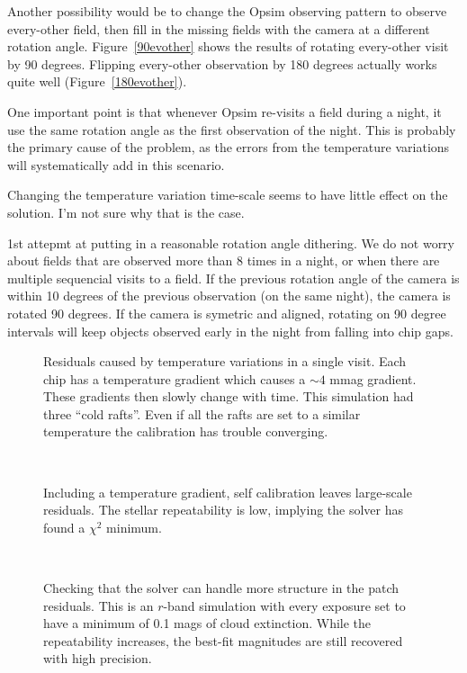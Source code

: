 Another possibility would be to change the Opsim observing pattern to observe every-other field, then fill in the missing fields with the camera at a different rotation angle.  Figure~\ref{90evother} shows the results of rotating every-other visit by 90 degrees.  Flipping every-other observation by 180 degrees actually works quite well (Figure~\ref{180evother}).

One important point is that whenever Opsim re-visits a field during a night, it use the same rotation angle as the first observation of the night.  This is probably the primary cause of the problem, as the errors from the temperature variations will systematically add in this scenario.


Changing the temperature variation time-scale seems to have little effect on the solution.  I'm not sure why that is the case.

1st attepmt at putting in a reasonable rotation angle dithering.  We do not worry about fields that are observed more than 8 times in a night, or when there are multiple sequencial visits to a field.  If the previous rotation angle of the camera is within 10 degrees of the previous observation (on the same night), the camera is rotated 90 degrees.  If the camera is symetric and aligned, rotating on 90 degree intervals will keep objects observed early in the night from falling into chip gaps.   


\begin{figure}
\caption{Residuals caused by temperature variations in a single visit.  Each chip has a temperature gradient which causes a $\sim 4$ mmag gradient.  These gradients then slowly change with time.  This simulation had three ``cold rafts''.  Even if all the rafts are set to a similar temperature the calibration has trouble converging.  \label{dmag_temperature}}
\end{figure}

\begin{figure}
\\
\caption{Including a temperature gradient, self calibration leaves large-scale residuals.  The stellar repeatability is low, implying the solver has found a $\chi^2$ minimum. \label{y_chip}}
\end{figure}

\begin{figure}
\\
\caption{Checking that the solver can handle more structure in the patch residuals.  This is an $r$-band simulation with every exposure set to have a minimum of 0.1 mags of cloud extinction.  While the repeatability increases, the best-fit magnitudes are still recovered with high precision. \label{min_clouds}}
\end{figure}

